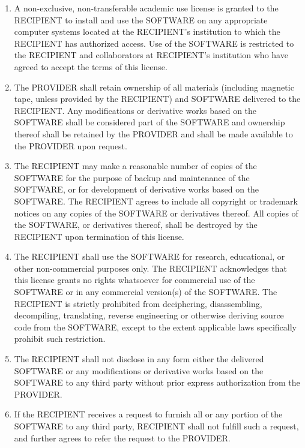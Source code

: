 \begin{enumerate}

\item A non-exclusive, non-transferable academic use license is
granted to the RECIPIENT to install and use the SOFTWARE on any
appropriate computer systems located at the RECIPIENT's institution
to which the RECIPIENT has authorized access. Use of the SOFTWARE is
restricted to the RECIPIENT and collaborators at RECIPIENT's
institution who have agreed to accept the terms of this license.

\item The PROVIDER shall retain ownership of all materials (including
magnetic tape, unless provided by the RECIPIENT) and SOFTWARE
delivered to the RECIPIENT. Any modifications or derivative works
based on the SOFTWARE shall be considered part of the SOFTWARE and
ownership thereof shall be retained by the PROVIDER and shall be made
available to the PROVIDER upon request.

\item The RECIPIENT may make a reasonable number of copies of the
SOFTWARE for the purpose of backup and maintenance of the SOFTWARE, or
for development of derivative works based on the SOFTWARE. The
RECIPIENT agrees to include all copyright or trademark notices on any
copies of the SOFTWARE or derivatives thereof. All copies of the
SOFTWARE, or derivatives thereof, shall be destroyed by the RECIPIENT
upon termination of this license.

\item The RECIPIENT shall use the SOFTWARE for research, educational,
or other non-commercial purposes only. The RECIPIENT acknowledges that
this license grants no rights whatsoever for commercial use of the
SOFTWARE or in any commercial version(s) of the SOFTWARE. The
RECIPIENT is strictly prohibited from deciphering, disassembling,
decompiling, translating, reverse engineering or otherwise deriving
source code from the SOFTWARE, except to the extent applicable laws
specifically prohibit such restriction.

\item The RECIPIENT shall not disclose in any form either the
delivered SOFTWARE or any modifications or derivative works based on
the SOFTWARE to any third party without prior express authorization
from the PROVIDER.

\item If the RECIPIENT receives a request to furnish all or any
portion of the SOFTWARE to any third party, RECIPIENT shall not
fulfill such a request, and further agrees to refer the request to the
PROVIDER.


\end{enumerate}
